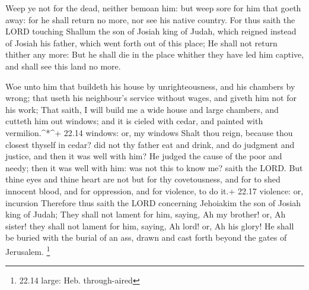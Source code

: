  Weep ye not for the dead, neither bemoan him: but weep
sore for him that goeth away: for he shall return no more, nor see his
native country.  For thus saith the LORD touching Shallum
the son of Josiah king of Judah, which reigned instead of Josiah his
father, which went forth out of this place; He shall not return thither
any more:  But he shall die in the place whither they have
led him captive, and shall see this land no more.

 Woe unto him that buildeth his house by unrighteousness,
and his chambers by wrong; that useth his neighbour's service without
wages, and giveth him not for his work;  That saith, I will
build me a wide house and large chambers, and cutteth him out windows;
and it is cieled with cedar, and painted with vermilion.\^{}*\^{}+ 22.14
windows: or, my windows  Shalt thou reign, because thou
closest thyself in cedar? did not thy father eat and drink, and do
judgment and justice, and then it was well with him?  He
judged the cause of the poor and needy; then it was well with him: was
not this to know me? saith the LORD.  But thine eyes and
thine heart are not but for thy covetousness, and for to shed innocent
blood, and for oppression, and for violence, to do it.+ 22.17 violence:
or, incursion  Therefore thus saith the LORD concerning
Jehoiakim the son of Josiah king of Judah; They shall not lament for
him, saying, Ah my brother! or, Ah sister! they shall not lament for
him, saying, Ah lord! or, Ah his glory!  He shall be buried
with the burial of an ass, drawn and cast forth beyond the gates of
Jerusalem. \footnote{22.14 large: Heb. through-aired}

